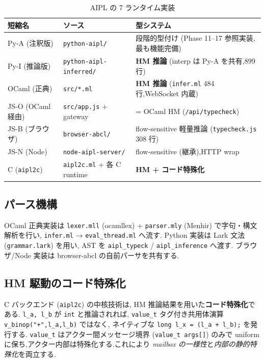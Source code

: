 \documentclass[11pt,a4paper]{article}
\newcommand{\code}[1]{\texttt{\small #1}}
\begin{document}
\begin{table}[h]
\centering\small
\caption{AIPL の 7 ランタイム実装}\label{tab:runtimes}
\begin{tabularx}{\linewidth}{@{}l l X@{}}
\toprule
短縮名 & ソース & 型システム \\
\midrule
Py-A (注釈版) & \code{python-aipl/} & 段階的型付け (Phase 11--17 参照実装,最も機能完備) \\
Py-I (推論版) & \code{python-aipl-inferred/} & \textbf{HM 推論} (interp は Py-A を共有,899 行) \\
OCaml (正典) & \code{src/*.ml} & \textbf{HM 推論} (\code{infer.ml} 484 行,WebSocket 内蔵) \\
JS-O (OCaml 経由) & \code{src/app.js} + gateway & = OCaml HM (\code{/api/typecheck}) \\
JS-B (ブラウザ) & \code{browser-abcl/} & flow-sensitive 軽量推論 (\code{typecheck.js} 308 行) \\
JS-N (Node) & \code{node-aipl-server/} & flow-sensitive (継承),HTTP wrap \\
C (\code{aipl2c}) & \code{aipl2c.ml} + 各 C runtime & \textbf{HM + コード特殊化} \\
\bottomrule
\end{tabularx}
\end{table}

\subsection{パース機構}
OCaml 正典実装は \code{lexer.mll} (ocamllex) +
\code{parser.mly} (Menhir) で字句・構文解析を行い,
\code{infer.ml} → \code{eval\_thread.ml} へ流す.
Python 実装は Lark 文法 (\code{grammar.lark}) を用い,
AST を \code{aipl\_typeck} / \code{aipl\_inference} へ渡す.
ブラウザ/Node 実装は browser-abcl の自前パーサを共有する.

\subsection{HM 駆動のコード特殊化}\label{sec:codegen}
C バックエンド (\code{aipl2c}) の中核技術は,
HM 推論結果を用いた\textbf{コード特殊化}である.
\code{l\_a, l\_b} が \code{int} と推論されれば,
\code{value\_t} タグ付き共用体演算
\code{v\_binop("+",l\_a,l\_b)} ではなく,
ネイティブな \code{long l\_x = (l\_a + l\_b);} を発行する.
\code{value\_t} はアクター間メッセージ境界 (\code{value\_t args[]}) のみで
uniform に保ち,アクター内部は特殊化する.これにより
\emph{mailbox の一様性}と\emph{内部の静的特殊化}を両立する.
\end{document}
